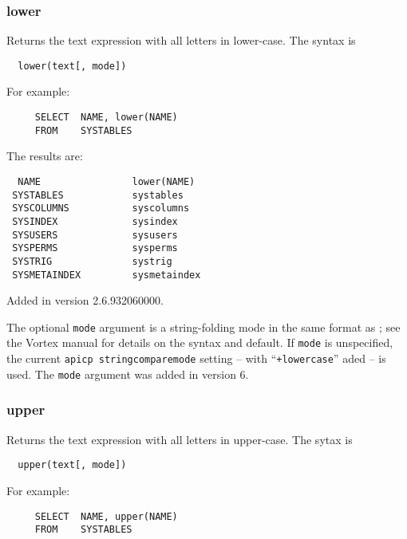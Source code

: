 \subsubsection{lower}

Returns the text expression with all letters in lower-case. The syntax is
\begin{verbatim}
  lower(text[, mode])
\end{verbatim}

For example:

\begin{verbatim}
     SELECT  NAME, lower(NAME)
     FROM    SYSTABLES
\end{verbatim}

The results are:

\begin{screen}
\begin{verbatim}
  NAME                lower(NAME)
 SYSTABLES            systables
 SYSCOLUMNS           syscolumns
 SYSINDEX             sysindex
 SYSUSERS             sysusers
 SYSPERMS             sysperms
 SYSTRIG              systrig
 SYSMETAINDEX         sysmetaindex
\end{verbatim}
\end{screen}

Added in version 2.6.932060000.

  The optional \verb`mode` argument is a string-folding mode in the
same format as {\tt <apicp stringcomparemode>}; see the Vortex manual
for details on the syntax and default.  If \verb`mode` is unspecified,
the current {\tt apicp stringcomparemode} setting -- with ``{\tt +lowercase}''
aded -- is used.  The \verb`mode` argument was added in version 6.

\subsubsection{upper}

Returns the text expression with all letters in upper-case. The sytax is
\begin{verbatim}
  upper(text[, mode])
\end{verbatim}

For example:

\begin{verbatim}
     SELECT  NAME, upper(NAME)
     FROM    SYSTABLES
\end{verbatim}

